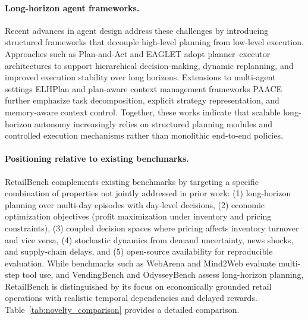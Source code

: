 \paragraph{Long-horizon agent frameworks.}
Recent advances in agent design address these challenges by introducing structured frameworks that decouple high-level planning from low-level execution. Approaches such as Plan-and-Act \citep{erdogan2025planandactimprovingplanningagents} and EAGLET \citep{si2025goalplanjustwish} adopt planner--executor architectures to support hierarchical decision-making, dynamic replanning, and improved execution stability over long horizons. Extensions to multi-agent settings ELHPlan \citep{ling2025elhplanefficientlonghorizontask} and plan-aware context management frameworks PAACE \citep{yuksel2025paaceplanawareautomatedagent} further emphasize task decomposition, explicit strategy representation, and memory-aware context control. Together, these works indicate that scalable long-horizon autonomy increasingly relies on structured planning modules and controlled execution mechanisms rather than monolithic end-to-end policies.

\paragraph{Positioning relative to existing benchmarks.}
RetailBench complements existing benchmarks by targeting a specific combination of properties not jointly addressed in prior work: (1) long-horizon planning over multi-day episodes with day-level decisions, (2) economic optimization objectives (profit maximization under inventory and pricing constraints), (3) coupled decision spaces where pricing affects inventory turnover and vice versa, (4) stochastic dynamics from demand uncertainty, news shocks, and supply-chain delays, and (5) open-source availability for reproducible evaluation. While benchmarks such as WebArena and Mind2Web evaluate multi-step tool use, and VendingBench and OdysseyBench assess long-horizon planning, RetailBench is distinguished by its focus on economically grounded retail operations with realistic temporal dependencies and delayed rewards. Table~\ref{tab:novelty_comparison} provides a detailed comparison.

